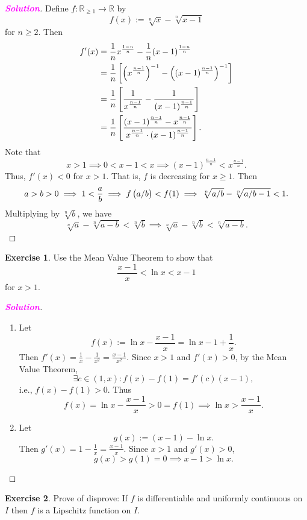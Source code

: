 \documentclass[12pt,openany]{book}
\theoremstyle{definition}
\newtheorem{exercise}{Exercise}[chapter]
\newcommand{\R}{\mathbb{R}}
\newcommand{\ie}{\textnormal{i.e.}}
\newcommand{\sol}{\textcolor{magenta}{\bf Solution}}
\begin{document}
	\begin{proof}[\sol]
		Define $f:\R_{\geq 1}\to\R$ by \[
		f(x):=\sqrt[n]{x}-\sqrt[n]{x-1}
		\] for $n\geq 2$. Then \begin{align*}
			f'(x)&=\frac{1}{n}x^{\frac{1-n}{n}}-\frac{1}{n}(x-1)^{\frac{1-n}{n}}\\
			&=\frac{1}{n}\sbr{\del{x^{\frac{n-1}{n}}}^{-1}-\del{(x-1)^{\frac{n-1}{n}}}^{-1}}\\
			&=\frac{1}{n}\sbr{\frac{1}{x^{\frac{n-1}{n}}}-\frac{1}{(x-1)^{\frac{n-1}{n}}}}\\
			&=\frac{1}{n}\sbr{\frac{(x-1)^{\frac{n-1}{n}}-x^{\frac{n-1}{n}}}{x^{\frac{n-1}{n}}\cdot (x-1)^{\frac{n-1}{n}}}}.
		\end{align*}
		Note that \[
		x>1\implies 0<x-1<x\implies (x-1)^{\frac{n-1}{n}}<x^{\frac{n-1}{n}}.
		\] Thus, $f'(x)<0$ for $x>1$. That is, $f$ is decreasing for $x\geq 1$. Then \[
		a>b>0\implies 1<\frac{a}{b}\implies f\del{a/b}<f(1)\implies\sqrt[n]{a/b}-\sqrt[n]{a/b-1}<1.
		\] Multiplying by $\sqrt[n]{b}$, we have \[
		\sqrt[n]{a}-\sqrt[n]{a-b}<\sqrt[n]{b}\implies
		\sqrt[n]{a}-\sqrt[n]{b}<\sqrt[n]{a-b}.
		\]
	\end{proof}
	\vspace{20pt}
	\newpage
	\begin{tcolorbox}[colframe=execolor, title={\color{white}\bf}]
	\begin{exercise}
		Use the Mean Value Theorem to show that \[
		\frac{x-1}{x}<\ln x<x-1
		\] for $x>1$.
	\end{exercise}
	\end{tcolorbox}
	\begin{proof}[\sol]
		\ \begin{enumerate}[(1)]
			\item Let \[
			f(x):=\ln x-\frac{x-1}{x}=\ln x - 1+\frac{1}{x}.
			\] Then $\displaystyle
			f'(x)=\frac{1}{x}-\frac{1}{x^2}=\frac{x-1}{x^2}
			$. Since $x>1$ and $f'(x)>0$, by the Mean Value Theorem, \[
			\exists c\in(1,x):f(x)-f(1)=f'(c)(x-1),
			\] \ie, $f(x)-f(1)>0$. Thus \[
			f(x)=\ln x-\frac{x-1}{x} > 0=f(1)\implies\ln x>\frac{x-1}{x}.
			\]
			\item Let \[
			g(x):=(x-1)-\ln x.
			\] Then $\displaystyle g'(x)=1-\frac{1}{x}=\frac{x-1}{x}$. Since $x>1$ and $g'(x)>0$, \[
			g(x)>g(1)=0\implies x-1>\ln x.
			\]
		\end{enumerate}
	\end{proof}
	\vspace{20pt}
	\begin{tcolorbox}[colframe=execolor, title={\color{white}\bf}]
	\begin{exercise}
		Prove of disprove: If $f$ is differentiable and uniformly continuous on $I$
		then $f$ is a Lipschitz function on $I$.
	\end{exercise}
	\end{tcolorbox}
\end{document}
